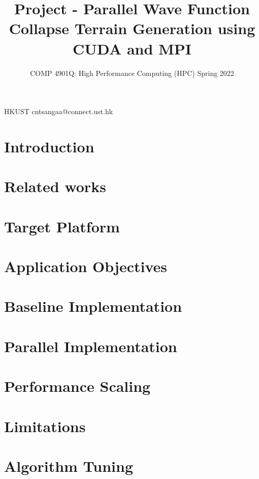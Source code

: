 \documentclass[nocopyrightspace,12pt,onecolumn,authoryear,preprint]{sigplanconf}
\begin{document}


\title{Project - Parallel Wave Function Collapse Terrain Generation using CUDA and MPI}
\subtitle{COMP 4901Q: High Performance Computing (HPC) Spring 2022}

           {HKUST}
           {cntsangaa@connect.ust.hk}

\maketitle

\section{Introduction}


\section{Related works}


\section{Target Platform}


\section{Application Objectives}


\section{Baseline Implementation}


\section{Parallel Implementation}


\section{Performance Scaling}


\section{Limitations}


\section{Algorithm Tuning}




\end{document}
